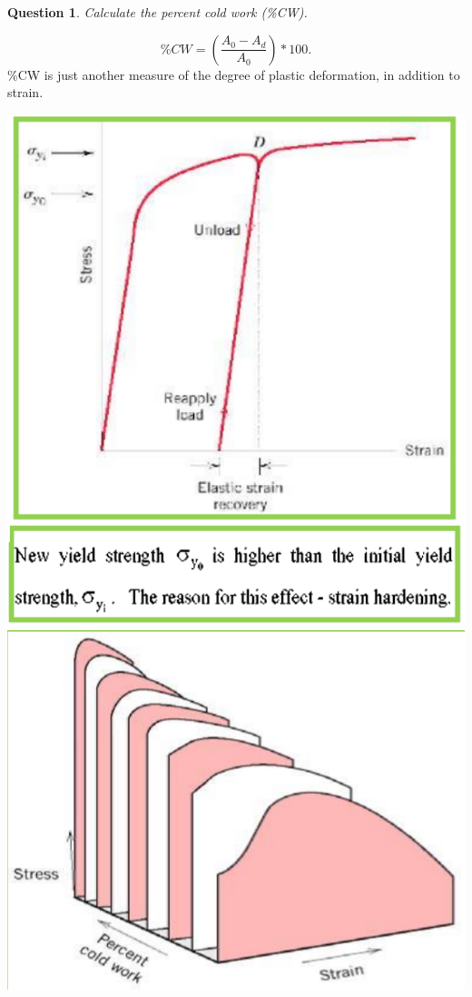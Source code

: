 \documentclass[13]{article}
\newtheorem{exer}{Question}
\begin{document}
\begin{exer}
	Calculate the percent cold work (\%CW). 
\end{exer}
\[
	\% CW = ( \frac{A_0-A_d}{A_0} )*100
.\] 
\%CW is just another measure of the degree of plastic deformation, in addition to strain.
\begin{center}
\includegraphics[scale=0.5]{figures/22.png} \includegraphics[scale=0.5]{figures/23.png}
\end{center}
\end{document}
